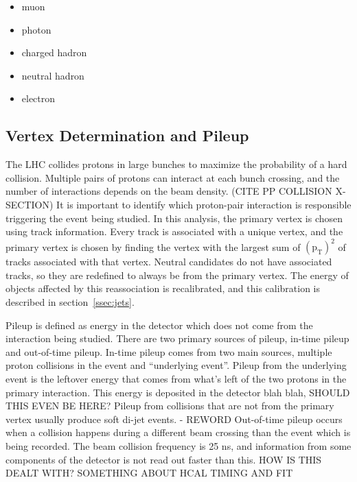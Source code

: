 \begin{itemize}
\item muon          
\item photon        
\item charged hadron
\item neutral hadron
\item electron      
\end{itemize}

\subsection{Vertex Determination and Pileup}
\label{ssec:vtxandpileup}
The LHC collides protons in large bunches to maximize the probability of a hard collision.
Multiple pairs of protons can interact at each bunch crossing, and the number of interactions depends on the beam density. (CITE PP COLLISION X-SECTION)
It is important to identify which proton-pair interaction is responsible triggering the event being studied.
In this analysis, the primary vertex is chosen using track information.
Every track is associated with a unique vertex,
and the primary vertex is chosen by finding the vertex with the largest sum of $\mathrm{(p_{T})^{2}}$ of tracks associated with that vertex.
Neutral candidates do not have associated tracks, so they are redefined to always be from the primary vertex.
The energy of objects affected by this reassociation is recalibrated, and this calibration is described in section~\ref{ssec:jets}.

Pileup is defined as energy in the detector which does not come from the interaction being studied.
There are two primary sources of pileup, in-time pileup and out-of-time pileup.
In-time pileup comes from two main sources, multiple proton collisions in the event and ``underlying event''.
Pileup from the underlying event is the leftover energy that comes from what's left of the two protons in the primary interaction.
This energy is deposited in the detector blah blah, SHOULD THIS EVEN BE HERE?
Pileup from collisions that are not from the primary vertex usually produce soft di-jet events. - REWORD
Out-of-time pileup occurs when a collision happens during a different beam crossing than the event which is being recorded. 
The beam collision frequency is 25 ns, and information from some components of the detector is not read out faster than this.
HOW IS THIS DEALT WITH? SOMETHING ABOUT HCAL TIMING AND FIT

